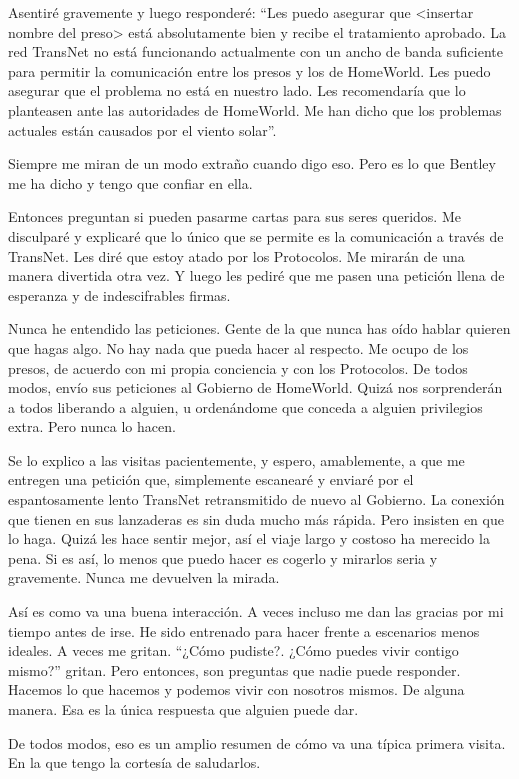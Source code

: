 Asentiré gravemente y luego responderé: ``Les puedo asegurar que
\textless{}insertar nombre del preso\textgreater{} está absolutamente
bien y recibe el tratamiento aprobado. La red TransNet no está
funcionando actualmente con un ancho de banda suficiente para permitir
la comunicación entre los presos y los de HomeWorld. Les puedo asegurar
que el problema no está en nuestro lado. Les recomendaría que lo
planteasen ante las autoridades de HomeWorld. Me han dicho que los
problemas actuales están causados por el viento solar''.

Siempre me miran de un modo extraño cuando digo eso. Pero es lo que
Bentley me ha dicho y tengo que confiar en ella.

Entonces preguntan si pueden pasarme cartas para sus seres queridos. Me
disculparé y explicaré que lo único que se permite es la comunicación a
través de TransNet. Les diré que estoy atado por los Protocolos. Me
mirarán de una manera divertida otra vez. Y luego les pediré que me
pasen una petición llena de esperanza y de indescifrables firmas.

Nunca he entendido las peticiones. Gente de la que nunca has oído hablar
quieren que hagas algo. No hay nada que pueda hacer al respecto. Me
ocupo de los presos, de acuerdo con mi propia conciencia y con los
Protocolos. De todos modos, envío sus peticiones al Gobierno de
HomeWorld. Quizá nos sorprenderán a todos liberando a alguien, u
ordenándome que conceda a alguien privilegios extra. Pero nunca lo
hacen.

Se lo explico a las visitas pacientemente, y espero, amablemente, a que
me entregen una petición que, simplemente escanearé y enviaré por el
espantosamente lento TransNet retransmitido de nuevo al Gobierno. La
conexión que tienen en sus lanzaderas es sin duda mucho más rápida. Pero
insisten en que lo haga. Quizá les hace sentir mejor, así el viaje largo
y costoso ha merecido la pena. Si es así, lo menos que puedo hacer es
cogerlo y mirarlos seria y gravemente. Nunca me devuelven la mirada.

Así es como va una buena interacción. A veces incluso me dan las gracias
por mi tiempo antes de irse. He sido entrenado para hacer frente a
escenarios menos ideales. A veces me gritan. ``¿Cómo pudiste?. ¿Cómo
puedes vivir contigo mismo?'' gritan. Pero entonces, son preguntas que
nadie puede responder. Hacemos lo que hacemos y podemos vivir con
nosotros mismos. De alguna manera. Esa es la única respuesta que alguien
puede dar.

De todos modos, eso es un amplio resumen de cómo va una típica primera
visita. En la que tengo la cortesía de saludarlos.

